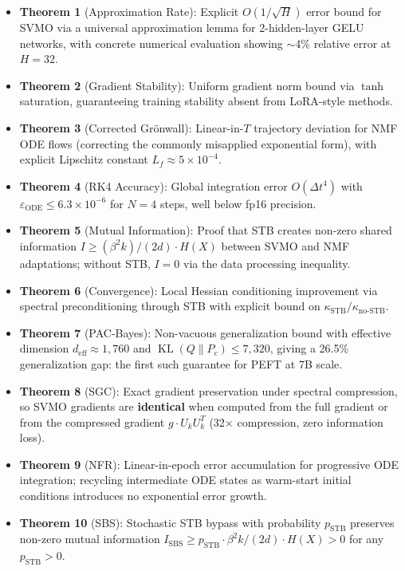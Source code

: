 \documentclass{scpe}
\newcommand{\svmo}{\textsc{SVMO}}
\newcommand{\nmf}{\textsc{NMF}}
\newcommand{\stb}{\textsc{STB}}
\newcommand{\KL}{\operatorname{KL}}
\begin{document}
\begin{itemize}[leftmargin=*]
    \item \textbf{Theorem 1} (Approximation Rate): Explicit $O(1/\sqrt{H})$ error bound for \svmo{} via a universal approximation lemma for 2-hidden-layer GELU networks, with concrete numerical evaluation showing $\sim$4\% relative error at $H=32$.
    \item \textbf{Theorem 2} (Gradient Stability): Uniform gradient norm bound via $\tanh$ saturation, guaranteeing training stability absent from LoRA-style methods.
    \item \textbf{Theorem 3} (Corrected Gr\"onwall): Linear-in-$T$ trajectory deviation for \nmf{} ODE flows (correcting the commonly misapplied exponential form), with explicit Lipschitz constant $L_f \approx 5\times 10^{-4}$.
    \item \textbf{Theorem 4} (RK4 Accuracy): Global integration error $O(\Delta t^4)$ with $\varepsilon_{\text{ODE}} \leq 6.3\times 10^{-6}$ for $N=4$ steps, well below fp16 precision.
    \item \textbf{Theorem 5} (Mutual Information): Proof that \stb{} creates non-zero shared information $I \geq (\beta^2 k)/(2d) \cdot H(X)$ between SVMO and NMF adaptations; without \stb{}, $I=0$ via the data processing inequality.
    \item \textbf{Theorem 6} (Convergence): Local Hessian conditioning improvement via spectral preconditioning through \stb{} with explicit bound on $\kappa_{\text{STB}}/\kappa_{\text{no-STB}}$.
    \item \textbf{Theorem 7} (PAC-Bayes): Non-vacuous generalization bound with effective dimension $d_{\text{eff}} \approx 1{,}760$ and $\KL(Q\|P_c) \leq 7{,}320$, giving a 26.5\% generalization gap: the first such guarantee for PEFT at 7B scale.
    \item \textbf{Theorem 8} (SGC): Exact gradient preservation under spectral compression, so SVMO gradients are \textbf{identical} when computed from the full gradient or from the compressed gradient $g \cdot U_k U_k^T$ (32$\times$ compression, zero information loss).
    \item \textbf{Theorem 9} (NFR): Linear-in-epoch error accumulation for progressive ODE integration; recycling intermediate ODE states as warm-start initial conditions introduces no exponential error growth.
    \item \textbf{Theorem 10} (SBS): Stochastic STB bypass with probability $p_{\text{STB}}$ preserves non-zero mutual information $I_{\text{SBS}} \geq p_{\text{STB}} \cdot \beta^2 k/(2d) \cdot H(X) > 0$ for any $p_{\text{STB}} > 0$.
\end{itemize}
\end{document}

